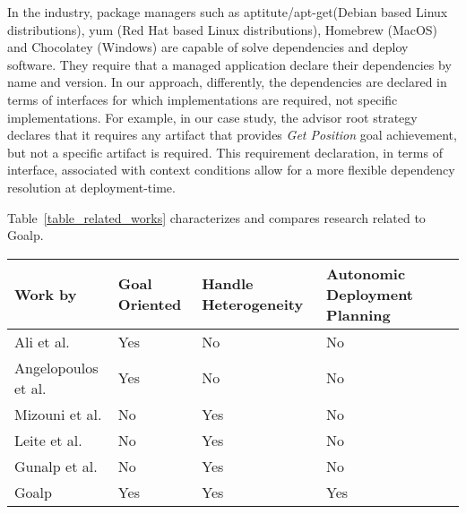 In the industry, package managers such as aptitute/apt-get(Debian based Linux distributions), yum (Red Hat based Linux distributions), Homebrew (MacOS) and Chocolatey (Windows) are capable of solve dependencies and deploy software. They require that a managed application declare their dependencies by name and version. In our approach, differently, the dependencies are declared in terms of interfaces for which implementations are required, not specific implementations. For example, in our case study, the advisor root strategy declares that it requires any artifact that provides \emph{Get Position} goal achievement, but not a specific artifact is required.
This requirement declaration, in terms of interface, associated with context conditions allow for a more flexible dependency resolution at deployment-time.

Table~\ref{table_related_works} characterizes and compares research related to Goalp.

\begin{table*}[t]
\centering
\caption{Comparing characteristic properties of selected approaches related to Goalp}
\label{table_related_works}
\begin{tabular}{|p{4cm}|p{1.75cm}|p{1.75cm}|p{1.75cm}|p{1.75cm}|}
\hline
Work by &
   Goal  \newline Oriented &
    Handle  \newline Heterogeneity &
    Autonomic  \newline  Deployment \newline Planning \\ \hline

Ali et al.\citep{ali_requirements-driven_2014} & Yes & No & No \\ \hline
Angelopoulos et al. \cite{angelopoulos_capturing_2015} & Yes & No & No \\ \hline
Mizouni et al. \citep{mizouni_framework_2014} & No & Yes & No \\ \hline
Leite et al. \citep{ferreira_leite_user_2014}  & No & Yes & No \\ \hline
Gunalp et al.\citep{gunalp_rondo_2015} & No & Yes  &  No\\ \hline
Goalp & Yes & Yes & Yes \\ \hline
\end{tabular}
\end{table*}


